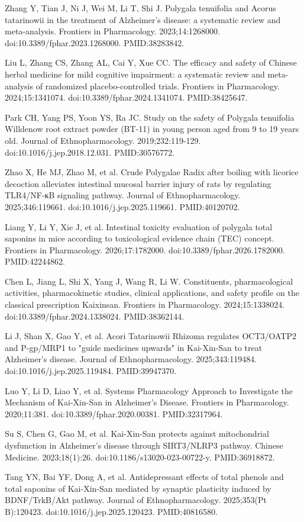 \documentclass[11pt,oneside]{book}
\newcommand{\reff}[2]{\par\hangindent=7mm\hangafter=1\noindent[#1]\hspace{2mm}#2\par}
\begin{document}
\reff{43}{Zhang Y, Tian J, Ni J, Wei M, Li T, Shi J. Polygala tenuifolia and Acorus tatarinowii in the treatment of Alzheimer's disease: a systematic review and meta-analysis. Frontiers in Pharmacology. 2023;14:1268000. doi:10.3389/fphar.2023.1268000. PMID:38283842.}
\reff{44}{Liu L, Zhang CS, Zhang AL, Cai Y, Xue CC. The efficacy and safety of Chinese herbal medicine for mild cognitive impairment: a systematic review and meta-analysis of randomized placebo-controlled trials. Frontiers in Pharmacology. 2024;15:1341074. doi:10.3389/fphar.2024.1341074. PMID:38425647.}
\reff{45}{Park CH, Yang PS, Yoon YS, Ra JC. Study on the safety of Polygala tenuifolia Willdenow root extract powder (BT-11) in young person aged from 9 to 19 years old. Journal of Ethnopharmacology. 2019;232:119-129. doi:10.1016/j.jep.2018.12.031. PMID:30576772.}
\reff{46}{Zhao X, He MJ, Zhao M, et al. Crude Polygalae Radix after boiling with licorice decoction alleviates intestinal mucosal barrier injury of rats by regulating TLR4/NF-κB signaling pathway. Journal of Ethnopharmacology. 2025;346:119661. doi:10.1016/j.jep.2025.119661. PMID:40120702.}
\reff{47}{Liang Y, Li Y, Xie J, et al. Intestinal toxicity evaluation of polygala total saponins in mice according to toxicological evidence chain (TEC) concept. Frontiers in Pharmacology. 2026;17:1782000. doi:10.3389/fphar.2026.1782000. PMID:42244862.}
\reff{48}{Chen L, Jiang L, Shi X, Yang J, Wang R, Li W. Constituents, pharmacological activities, pharmacokinetic studies, clinical applications, and safety profile on the classical prescription Kaixinsan. Frontiers in Pharmacology. 2024;15:1338024. doi:10.3389/fphar.2024.1338024. PMID:38362144.}
\reff{49}{Li J, Shan X, Gao Y, et al. Acori Tatarinowii Rhizoma regulates OCT3/OATP2 and P-gp/MRP1 to "guide medicines upwards" in Kai-Xin-San to treat Alzheimer's disease. Journal of Ethnopharmacology. 2025;343:119484. doi:10.1016/j.jep.2025.119484. PMID:39947370.}
\reff{50}{Luo Y, Li D, Liao Y, et al. Systems Pharmacology Approach to Investigate the Mechanism of Kai-Xin-San in Alzheimer's Disease. Frontiers in Pharmacology. 2020;11:381. doi:10.3389/fphar.2020.00381. PMID:32317964.}
\reff{51}{Su S, Chen G, Gao M, et al. Kai-Xin-San protects against mitochondrial dysfunction in Alzheimer's disease through SIRT3/NLRP3 pathway. Chinese Medicine. 2023;18(1):26. doi:10.1186/s13020-023-00722-y. PMID:36918872.}
\reff{52}{Tang YN, Bai YF, Dong A, et al. Antidepressant effects of total phenols and total saponins of Kai-Xin-San mediated by synaptic plasticity induced by BDNF/TrkB/Akt pathway. Journal of Ethnopharmacology. 2025;353(Pt B):120423. doi:10.1016/j.jep.2025.120423. PMID:40816580.}
\end{document}
